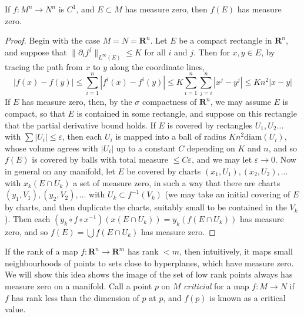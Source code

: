 \begin{lemma}
    If $f: M^n \to N^n$ is $C^1$, and $E \subset M$ has measure zero, then $f(E)$ has measure zero.
\end{lemma}
\begin{proof}
    Begin with the case $M = N = \mathbf{R}^n$. Let $E$ be a compact rectangle in $\mathbf{R}^n$, and suppose that $\| \partial_i f^j \|_{L^\infty(E)} \leq K$ for all $i$ and $j$. Then for $x,y \in E$, by tracing the path from $x$ to $y$ along the coordinate lines,
    \[ |f(x) - f(y)| \leq \sum_{i = 1}^n |f^i(x) - f^i(y)| \leq K \sum_{i = 1}^n \sum_{j = i}^n |x^j - y^j| \leq Kn^2 |x-y| \]
    If $E$ has measure zero, then, by the $\sigma$ compactness of $\mathbf{R}^n$, we may assume $E$ is compact, so that $E$ is contained in some rectangle, and suppose on this rectangle that the partial derivative bound holds. If $E$ is covered by rectangles $U_1, U_2 \dots$ with $\sum |U_i| \leq \varepsilon$, then each $U_i$ is mapped into a ball of radius $Kn^2 \text{diam}(U_i)$, whose volume agrees with $|U_i|$ up to a constant $C$ depending on $K$ and $n$, and so $f(E)$ is covered by balls with total measure $\leq C\varepsilon$, and we may let $\varepsilon \to 0$. Now in general on any manifold, let $E$ be covered by charts $(x_1,U_1), (x_2,U_2), \dots$ with $x_k(E \cap U_k)$ a set of measure zero, in such a way that there are charts $(y_1,V_1), (y_2,V_2), \dots$ with $U_k \subset f^{-1}(V_k)$ (we may take an initial covering of $E$ by charts, and then duplicate the charts, suitably small to be contained in the $V_k$). Then each $(y_k \circ f \circ x^{-1})(x(E \cap U_k)) = y_k(f(E \cap U_k))$ has measure zero, and so $f(E) = \bigcup f(E \cap U_k)$ has measure zero.
\end{proof}

If the rank of a map $f: \mathbf{R}^n \to \mathbf{R}^m$ has rank $< m$, then intuitively, it maps small neighbourhoods of points to sets close to hyperplanes, which have measure zero. We will show this idea shows the image of the set of low rank points always has measure zero on a manifold. Call a point $p$ on $M$ \emph{criticial} for a map $f:M \to N$ if $f$ has rank less than the dimension of $p$ at $p$, and $f(p)$ is known as a critical value.

